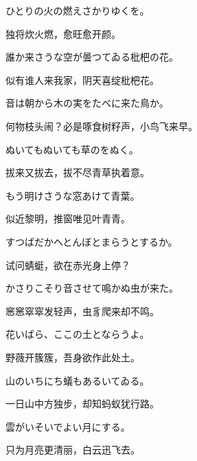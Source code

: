 \begin{haiku}
    {\FH ひとりの火の燃えさかりゆくを。}

    {\FK 独将炊火燃，愈旺愈开颜。}
\end{haiku}

\begin{haiku}
    {\FH 誰か来さうな空が曇つてゐる枇杷の花。}

    {\FK 似有谁人来我家，阴天喜绽枇杷花。}
\end{haiku}

\begin{haiku}
    {\FH 音は朝から木の実をたべに来た鳥か。}

    {\FK 何物枝头闹？必是啄食树籽声，小鸟飞来早。}
\end{haiku}

\begin{haiku}
    {\FH ぬいてもぬいても草のをぬく。}

    {\FK 拔来又拔去，拔不尽青草执着意。}
\end{haiku}

\begin{haiku}
    {\FH もう明けさうな窓あけて青葉。}

    {\FK 似近黎明，推窗唯见叶青青。}
\end{haiku}

\begin{haiku}
    {\FH すつばだかへとんぼとまらうとするか。}

    {\FK 试问蜻蜓，欲在赤光身上停？}
\end{haiku}

\begin{haiku}
    {\FH かさりこそり音させて鳴かぬ虫が来た。}

    {\FK 窸窸窣窣发轻声，虫豸爬来却不鸣。}
\end{haiku}

\begin{haiku}
    {\FH 花いばら、ここの土とならうよ。}

    {\FK 野薇开簇簇，吾身欲作此处土。}
\end{haiku}

\begin{haiku}
    {\FH 山のいちにち蟻もあるいてゐる。}

    {\FK 一日山中方独步，却知蚂蚁犹行路。}
\end{haiku}

\begin{haiku}
    {\FH 雲がいそいでよい月にする。}

    {\FK 只为月亮更清丽，白云迅飞去。}
\end{haiku}

